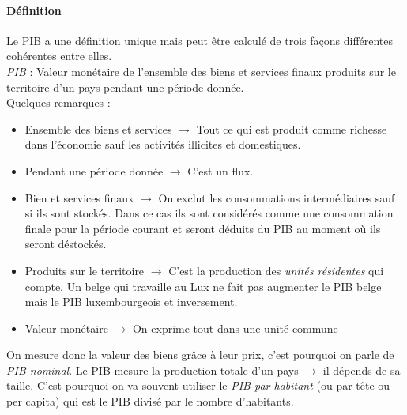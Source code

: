 \documentclass[10pt]{book}
\begin{document}
\paragraph{Définition}
Le PIB a une définition unique mais peut être calculé de trois façons différentes cohérentes entre elles. \\
\textit{PIB} : Valeur monétaire de l'ensemble des biens et services finaux produits sur le territoire d'un pays pendant une période donnée. \\
Quelques remarques : 
\begin{itemize}
  \item Ensemble des biens et services $\rightarrow$ Tout ce qui est produit comme richesse dans l'économie sauf les activités illicites et domestiques.
  \item Pendant une période donnée $\rightarrow$ C'est un flux.
  \item Bien et services finaux $\rightarrow$ On exclut les consommations intermédiaires sauf si ils sont stockés. Dans ce cas ils sont considérés comme une consommation finale pour la période courant et seront déduits du PIB au moment où ils seront déstockés.
  \item Produits sur le territoire $\rightarrow$ C'est la production des \textit{unités résidentes} qui compte. Un belge qui travaille au Lux ne fait pas augmenter le PIB belge mais le PIB luxembourgeois et inversement.
  \item Valeur monétaire $\rightarrow$ On exprime tout dans une unité commune
\end{itemize}
On mesure donc la valeur des biens grâce à leur prix, c'est pourquoi on parle de \textit{PIB nominal}. Le PIB mesure la production totale d'un pays $\rightarrow$ il dépends de sa taille. C'est pourquoi on va souvent utiliser le \textit{PIB par habitant} (ou par tête ou per capita) qui est le PIB  divisé par le nombre d'habitants.
\end{document}
